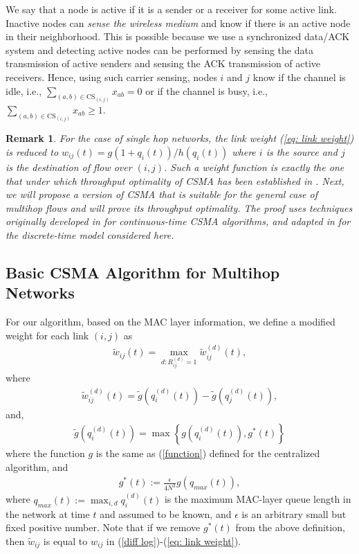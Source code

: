 \documentclass[10pt,onecolumn,draftclsnofoot,journal]{IEEEtran}
\newtheorem{remark}{Remark}
\newcommand{\be}{\begin{eqnarray}}
\newcommand{\ee}{\end{eqnarray}}
\begin{document}
We say that a node is active if it is a sender or a receiver for some active link. Inactive nodes can \textit{sense the wireless medium} and know if there is an active node in their neighborhood. This is possible because we use a synchronized data/ACK system and detecting active nodes can be performed by sensing the data transmission of active senders and sensing the ACK transmission of active receivers. Hence, using such carrier sensing, nodes $i$ and $j$ know if the channel is idle, i.e., $\sum_{(a,b)\in \mathrm{CS}_{(i,j)}}x_{ab}=0$ or if the channel is busy, i.e., $\sum_{(a,b)\in \mathrm{CS}_{(i,j)}}x_{ab} \geq 1$.
\begin{remark}
For the case of single hop networks, the link weight (\ref{eq: link weight}) is reduced to $w_{ij}(t)=g(1+q_i(t))/h(q_i(t))$ where $i$ is the source and $j$ is the destination of flow over $(i,j)$. Such a weight function is exactly the one that under which throughput optimality of CSMA has been established in \cite{ghaderi}.
Next, we will propose a version of CSMA that is suitable for the general case of multihop flows and will prove its throughput optimality. The proof uses techniques originally developed in \cite{shah, shah2} for continuous-time CSMA algorithms, and adapted in \cite{ghaderi} for the discrete-time model considered here.
\end{remark}
\subsection{Basic CSMA Algorithm for Multihop Networks }
For our algorithm, based on the MAC layer information, we define a modified weight for each link $(i,j)$ as
\be \label{eq: link weight modified}
\tilde{w}_{ij}(t) = \max_{d:R_{ij}^{(d)}=1} \tilde{w}^{(d)}_{ij}(t),
\ee
where
\be
\tilde{w}^{(d)}_{ij}(t)=\tilde{g}\left(q_i^{(d)}(t)\right)-\tilde{g}\left(q_j^{(d)}(t)\right),
\ee
and,
\be
\tilde{g}\left(q_i^{(d)}(t)\right)=\max \left\{g\left(q_i^{(d)}(t)\right),g^*(t)\right\}
\ee
where the function $g$ is the same as (\ref{function}) defined for the centralized algorithm, and
\be \label{eq: gstar}
g^*(t):=\frac{\epsilon}{4N^3} g(q_{max}(t)),
\ee
where $q_{max}(t):=\max_{i,d} q^{(d)}_i(t)$ is the maximum MAC-layer queue length in the network at time $t$ and assumed to be known, and $\epsilon$ is an arbitrary small but fixed positive number.
Note that if we remove $g^*(t)$ from the above definition, then $\tilde{w}_{ij}$ is equal to $w_{ij}$ in (\ref{diff log})-(\ref{eq: link weight}).
\end{document}
